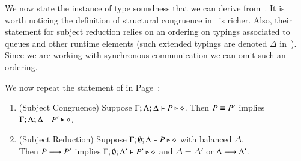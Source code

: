 We now state the instance of type soundness that we
can derive from~\cite{MostrousY15}.
It is worth noticing 
the 
definition of structural congruence in~\cite{MostrousY15} is richer. 
Also, their statement for subject reduction relies on an 
ordering on typings associated to queues and other 
runtime elements (such extended typings are denoted $\Delta$ in~\cite{MostrousY15}).
Since we are working with synchronous communication we can omit such an ordering.

We now repeat the statement of
 in Page~\pageref{thm:sr}:

\begin{theorem}%
	\begin{enumerate}[1.]
		\item	(Subject Congruence) Suppose $\Gamma; \Lambda; \Delta \vdash P \triangleright \diamond$.
			Then $P \equiv P'$ implies $\Gamma; \Lambda; \Delta \vdash P' \triangleright \diamond$.

		\item	(Subject Reduction) Suppose $\Gamma; \emptyset; \Delta \vdash P \triangleright \diamond$
			with
			balanced $\Delta$. \\
			Then $P \longrightarrow P'$ implies $\Gamma; \emptyset; \Delta'  \vdash P' \triangleright \diamond$
			and $\Delta = \Delta'$ or $\Delta \longrightarrow \Delta'$.

	\end{enumerate}
\end{theorem}

